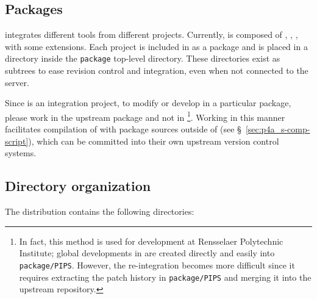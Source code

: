 \documentclass[a4paper]{article}
\begin{document}
\subsection{Packages}
\label{sec:packages}

\Apfa integrates different tools from different projects. Currently, \Apfa
is composed of \Apips, \Apipsgfc, \Apolylib, with some extensions. Each
project is included in \Apfa as a package and is placed in a directory
inside the \texttt{package} top-level directory.
These directories exist as \Agit subtrees to ease revision control and
integration, even when not connected to the \Asvn server.

Since \Apfa is an integration project, to modify or develop in
a particular package, please work in the upstream package and not in
\Apfa\footnote{In fact, this method is used for \Apfa development at Rensselaer
  Polytechnic Institute; global developments in \Apips are created
  directly and easily into \texttt{package/PIPS}. However,
  the re-integration becomes more difficult since it requires extracting the
  patch history in \texttt{package/PIPS} and merging it into the \Apips
  upstream \Asvn repository.}. Working in this manner facilitates
compilation of \Apfa with package sources outside of \Apfa (see
\S~\ref{sec:p4a_s-comp-script}), which can be committed into their own upstream
version control systems.


\subsection{Directory organization}
\label{sec:direct-organ}
The \Apfa distribution contains the following directories:
\end{document}
